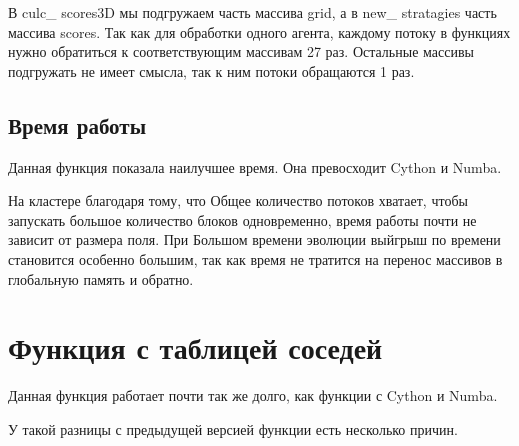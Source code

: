 \documentclass[a4paper,12pt]{article}
\begin{document}
В culc\_ scores3D мы подгружаем часть массива grid, а в new\_ stratagies часть массива scores. Так как для обработки одного агента, каждому потоку в функциях нужно обратиться к соответствующим массивам 27 раз. Остальные массивы подгружать не имеет смысла, так к ним потоки обращаются 1 раз.


\subsection{Время работы}

Данная функция показала наилучшее время. Она превосходит Cython и Numba. 


На кластере благодаря тому, что Общее количество потоков хватает, чтобы запускать большое количество блоков одновременно, время работы почти не зависит от размера поля. При Большом времени эволюции выйгрыш по времени становится особенно большим, так как время не тратится на перенос массивов в глобальную память и обратно.

\section{Функция с таблицей соседей}

Данная функция работает почти так же долго, как функции с Cython и Numba. 


У такой разницы с предыдущей версией функции есть несколько причин.
\end{document}
